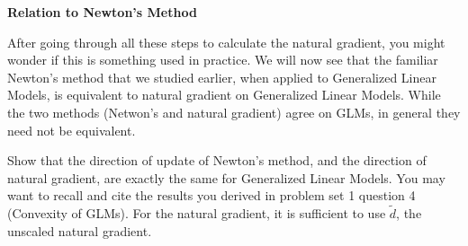 \ifnum{} {
  \clearpage
} \fi
\item {} \textbf{Relation to Newton's Method}


After going through all these steps to calculate the natural gradient, you might wonder if this is something used in practice. We will now see that the familiar Newton's method that we studied earlier, when applied to Generalized Linear Models, is equivalent to natural gradient on Generalized Linear Models. While the two methods (Netwon's and natural gradient) agree on GLMs, in general they need not be equivalent.


Show that the direction of update of Newton's method, and the direction of natural gradient, are exactly the same for Generalized Linear Models. You may want to recall and cite the results you derived in problem set 1 question 4 (Convexity of GLMs). For the natural gradient, it is sufficient to use $\tilde{d}$, the unscaled natural gradient.

\ifnum{} {
  
} \fi
